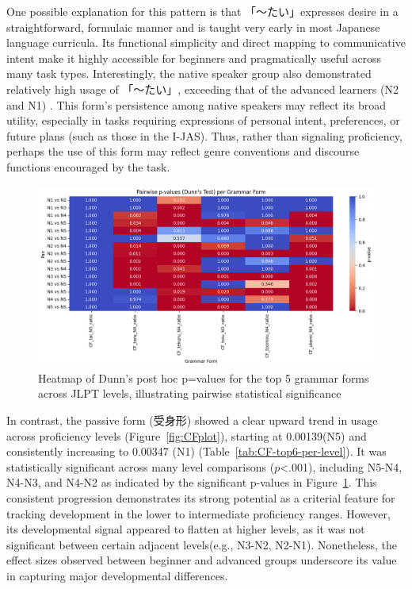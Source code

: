One possible
explanation for this pattern is that 「〜たい」expresses desire in a straightforward, formulaic manner and is taught very
early in most Japanese language curricula. Its functional simplicity and direct mapping to communicative intent make
it highly accessible for beginners and pragmatically useful across many task types. Interestingly, the native
speaker group also demonstrated relatively high usage of 「〜たい」, exceeding that of the advanced learners (N2 and N1)
. This form's persistence among native speakers may reflect its broad utility, especially in tasks
requiring expressions of personal intent, preferences, or future plans (such as those in the I-JAS). Thus,
rather than
signaling proficiency, perhaps the use of this form may reflect genre conventions and discourse functions encouraged
by the task.


\begin{figure}[h!]
\centering
\includegraphics[scale=.4]{img/CFheatmap}
\caption[Heatmap of top 5 grammar forms]{Heatmap of Dunn's post hoc p=values for the top 5 grammar forms across JLPT levels, illustrating pairwise statistical significance}
\label{fig:CFheatmap}
\end{figure}
In
contrast, the
passive form (受身形) showed a clear upward trend in usage across proficiency levels (Figure~\ref{fig:CFplot}),
starting at 0.00139(N5) and consistently increasing to 0.00347 (N1) (Table~\ref{tab:CF-top6-per-level}). It was statistically
significant
across many level comparisons ($p$<.001), including N5-N4, N4-N3, and N4-N2 as indicated by the significant p-values in
Figure~\ref{fig:CFheatmap}. This consistent progression demonstrates its strong potential as a criterial feature
for
tracking
development in the lower to intermediate
proficiency ranges. However, its developmental signal appeared to flatten at higher levels, as it was not significant
between certain adjacent levels(e.g., N3-N2, N2-N1). Nonetheless, the effect sizes observed between beginner
and advanced groups underscore its value in capturing major developmental differences.

